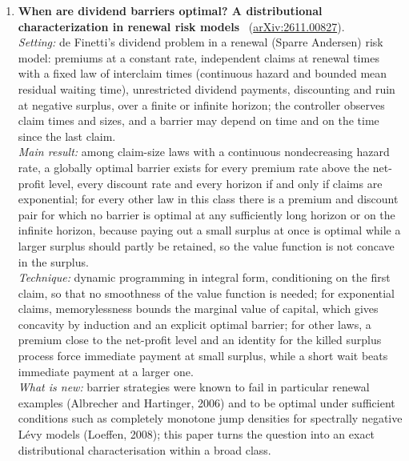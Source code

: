 \documentclass[11pt,a4paper]{article}
\begin{document}
\begin{enumerate}[leftmargin=*]
  \emph{Limitations:} product sets or strips only; the strongly degenerate case $\gamma > 1$ is restricted to $n = 1$ and its minimal time is left open; the proofs of the main theorems were cut off in the text read.\\
  \emph{Verdict:} tight characterisations, an exact minimal time and an if-and-only-if criterion for stabilisability, for a model degenerate parabolic equation, obtained with a new frequency-uniform spectral estimate; confidence medium (full text; proofs not reached).
  \item \textbf{When are dividend barriers optimal? A distributional characterization in renewal risk models}~\cite{miao2026dividend} (\href{https://arxiv.org/abs/2611.00827}{arXiv:2611.00827}).\\
  \emph{Setting:} de Finetti's dividend problem in a renewal (Sparre Andersen) risk model: premiums at a constant rate, independent claims at renewal times with a fixed law of interclaim times (continuous hazard and bounded mean residual waiting time), unrestricted dividend payments, discounting and ruin at negative surplus, over a finite or infinite horizon; the controller observes claim times and sizes, and a barrier may depend on time and on the time since the last claim.\\
  \emph{Main result:} among claim-size laws with a continuous nondecreasing hazard rate, a globally optimal barrier exists for every premium rate above the net-profit level, every discount rate and every horizon if and only if claims are exponential; for every other law in this class there is a premium and discount pair for which no barrier is optimal at any sufficiently long horizon or on the infinite horizon, because paying out a small surplus at once is optimal while a larger surplus should partly be retained, so the value function is not concave in the surplus.\\
  \emph{Technique:} dynamic programming in integral form, conditioning on the first claim, so that no smoothness of the value function is needed; for exponential claims, memorylessness bounds the marginal value of capital, which gives concavity by induction and an explicit optimal barrier; for other laws, a premium close to the net-profit level and an identity for the killed surplus process force immediate payment at small surplus, while a short wait beats immediate payment at a larger one.\\
  \emph{What is new:} barrier strategies were known to fail in particular renewal examples (Albrecher and Hartinger, 2006) and to be optimal under sufficient conditions such as completely monotone jump densities for spectrally negative L{\'e}vy models (Loeffen, 2008); this paper turns the question into an exact distributional characterisation within a broad class.\\

\end{enumerate}
\end{document}
